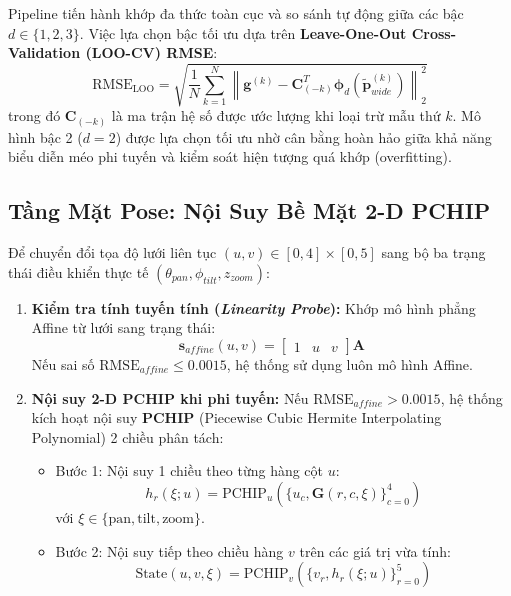 \documentclass[11pt,a4paper]{article}
\begin{document}
Pipeline tiến hành khớp đa thức toàn cục và so sánh tự động giữa các bậc $d \in \{1, 2, 3\}$. Việc lựa chọn bậc tối ưu dựa trên \textbf{Leave-One-Out Cross-Validation (LOO-CV) RMSE}:
\begin{equation}
    \text{RMSE}_{\text{LOO}} = \sqrt{\frac{1}{N} \sum_{k=1}^N \left\| \mathbf{g}^{(k)} - \mathbf{C}_{(-k)}^T \bm{\phi}_d(\tilde{\mathbf{p}}_{wide}^{(k)}) \right\|_2^2}
\end{equation}
trong đó $\mathbf{C}_{(-k)}$ là ma trận hệ số được ước lượng khi loại trừ mẫu thứ $k$. Mô hình bậc 2 ($d=2$) được lựa chọn tối ưu nhờ cân bằng hoàn hảo giữa khả năng biểu diễn méo phi tuyến và kiểm soát hiện tượng quá khớp (overfitting).

\subsection{Tầng Mặt Pose: Nội Suy Bề Mặt 2-D PCHIP}
Để chuyển đổi tọa độ lưới liên tục $(u, v) \in [0, 4] \times [0, 5]$ sang bộ ba trạng thái điều khiển thực tế $(\theta_{pan}, \phi_{tilt}, z_{zoom})$:
\begin{enumerate}
    \item \textbf{Kiểm tra tính tuyến tính (\textit{Linearity Probe}):} Khớp mô hình phẳng Affine từ lưới sang trạng thái:
    \begin{equation}
        \mathbf{s}_{affine}(u, v) = \begin{bmatrix} 1 & u & v \end{bmatrix} \mathbf{A}
    \end{equation}
    Nếu sai số $\text{RMSE}_{affine} \le 0.0015$, hệ thống sử dụng luôn mô hình Affine.
    \item \textbf{Nội suy 2-D PCHIP khi phi tuyến:} Nếu $\text{RMSE}_{affine} > 0.0015$, hệ thống kích hoạt nội suy \textbf{PCHIP} (Piecewise Cubic Hermite Interpolating Polynomial) 2 chiều phân tách:
    \begin{itemize}
        \item Bước 1: Nội suy 1 chiều theo từng hàng cột $u$:
        \begin{equation}
            h_r(\xi; u) = \text{PCHIP}_{u}\left(\{u_c, \mathbf{G}(r, c, \xi)\}_{c=0}^4\right)
        \end{equation}
        với $\xi \in \{\text{pan}, \text{tilt}, \text{zoom}\}$.
        \item Bước 2: Nội suy tiếp theo chiều hàng $v$ trên các giá trị vừa tính:
        \begin{equation}
            \text{State}(u, v, \xi) = \text{PCHIP}_{v}\left(\{v_r, h_r(\xi; u)\}_{r=0}^5\right)
        \end{equation}
    \end{itemize}
\end{enumerate}
\end{document}
